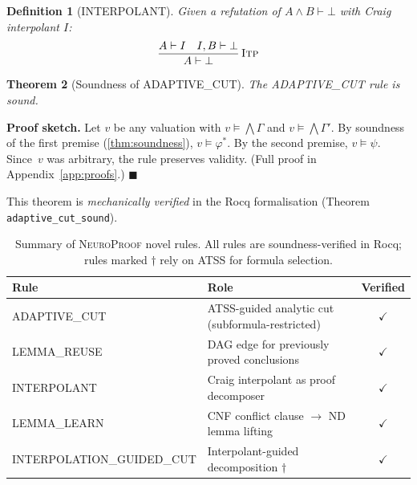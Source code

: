 \documentclass[conference]{IEEEtran}
\newtheorem{theorem}{Theorem}[section]
\newtheorem{definition}[theorem]{Definition}
\newenvironment{proof}[1][Proof]{\textbf{#1.} }{\hfill$\blacksquare$}
\newcommand{\entails}{\vDash}
\newcommand{\proves}{\vdash}
\newcommand{\dlbot}{\bot}
\newcommand{\NP}{\textsc{NeuroProof}}
\newcommand{\ATSS}{\textsc{ATSS}}
\newcommand{\infrule}[3]{
  \dfrac{\displaystyle #2}{\displaystyle #3}\,\textsc{#1}
}
\begin{document}
\begin{definition}[INTERPOLANT]
  Given a refutation of $A \wedge B \proves \dlbot$ with Craig
  interpolant $I$:
  \begin{equation}
    \infrule{Itp}
      {A \proves I \quad I, B \proves \dlbot}
      {A \proves \dlbot}
  \end{equation}
\end{definition}

\begin{theorem}[Soundness of ADAPTIVE\_CUT]
  \label{thm:adaptive-cut-sound}
  The \textup{ADAPTIVE\_CUT} rule is sound.
\end{theorem}
\begin{proof}[Proof sketch]
  Let $v$ be any valuation with
  $v \entails \bigwedge\Gamma$ and $v \entails \bigwedge\Gamma'$.
  By soundness of the first premise (\cref{thm:soundness}),
  $v \entails \varphi^*$.  By the second premise,
  $v \entails \psi$.  Since~$v$ was arbitrary, the rule preserves
  validity.
  (Full proof in Appendix~\ref{app:proofs}.)
\end{proof}

\noindent This theorem is \emph{mechanically verified} in the Rocq
formalisation (Theorem \texttt{adaptive\_cut\_sound}).

\begin{table}[t]
  \centering\footnotesize
  \caption{Summary of \NP{} novel rules.  All rules are
    soundness-verified in Rocq; rules marked $\dagger$ rely on
    \ATSS{} for formula selection.}
  \label{tab:novel-rules}
  \begin{tabular}{@{}l p{3.6cm} c@{}}
    \toprule
    Rule & Role & Verified \\
    \midrule
    ADAPTIVE\_CUT & \ATSS-guided analytic cut (subformula-restricted) & $\checkmark$ \\
    LEMMA\_REUSE & DAG edge for previously proved conclusions & $\checkmark$ \\
    INTERPOLANT & Craig interpolant as proof decomposer & $\checkmark$ \\
    LEMMA\_LEARN & CNF conflict clause $\to$ ND lemma lifting & $\checkmark$ \\
    INTERPOLATION\_GUIDED\_CUT & Interpolant-guided decomposition $\dagger$ & $\checkmark$ \\
    \bottomrule
  \end{tabular}
\end{table}

\end{document}
